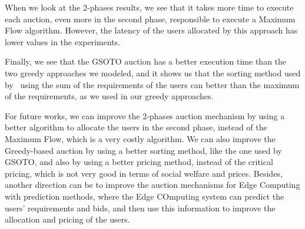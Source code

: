 \documentclass[English]{ic-tese-v3}
\begin{document}
When we look at the 2-phases results, we see that it takes more time to execute each auction, even more in the second phase, responsible to execute a Maximum Flow algorithm. However, the latency of the users allocated by this approach has lower values in the experiments.

Finally, we see that the GSOTO auction has a better execution time than the two greedy approaches we modeled, and it shows us that the sorting method used by~\cite{WeifengAuction2022} using the sum of the requirements of the users can better than the maximum of the requirements, as we used in our greedy approaches.

For future works, we can improve the 2-phases auction mechanism by using a better algorithm to allocate the users in the second phase, instead of the Maximum Flow, which is a very costly algorithm. We can also improve the Greedy-based auction by using a better sorting method, like the one used by GSOTO, and also by using a better pricing method, instead of the critical pricing, which is not very good in terms of social welfare and prices. Besides, another direction can be to improve the auction mechanisms for Edge Computing with prediction methods, where the Edge COmputing system can predict the users' requirements and bids, and then use this information to improve the allocation and pricing of the users.





\end{document}
